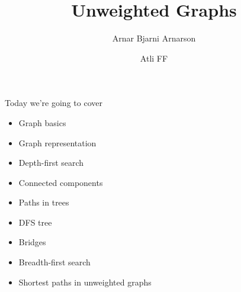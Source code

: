 \documentclass{beamer}
\title{Unweighted Graphs}
\author{Arnar Bjarni Arnarson \and Atli FF}
\institute{\href{http://ru.is/td}{School of Computer Science} \\[2pt] \href{http://ru.is}{Reykjavík University}}
\begin{document}
\maketitle

\begin{frame}[plain]{Today we're going to cover}
    \vspace{10pt}
    \begin{itemize}
        \item Graph basics
        \item Graph representation
        \item Depth-first search
        \item Connected components
        \item Paths in trees
        \item DFS tree
        \item Bridges
        \item Breadth-first search
        \item Shortest paths in unweighted graphs
    \end{itemize}
\end{frame}
\end{document}
